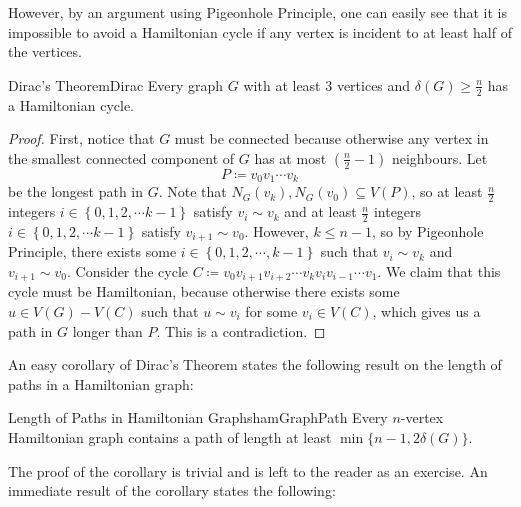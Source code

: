 \documentclass[math]{amznotes}
\theoremstyle{remark}
\newcommand{\0}{\mathbf{0}}
\newcommand{\1}{\mathbf{1}}
\begin{document}
However, by an argument using Pigeonhole Principle, one can easily see that it is impossible to avoid a Hamiltonian cycle if any vertex is incident to at least half of the vertices.
\begin{thmbox}{Dirac's Theorem}{Dirac}
    Every graph $G$ with at least $3$ vertices and $\delta(G) \geq \frac{n}{2}$ has a Hamiltonian cycle.
    \tcblower
    \begin{proof}
        First, notice that $G$ must be connected because otherwise any vertex in the smallest connected component of $G$ has at most $\left(\frac{n}{2} - 1\right)$ neighbours. Let 
        \begin{equation*}
            P \coloneqq v_0v_1\cdots v_k
        \end{equation*}
        be the longest path in $G$. Note that $N_G(v_k), N_G(v_0) \subseteq V(P)$, so at least $\frac{n}{2}$ integers $i \in \left\{0, 1, 2, \cdots k - 1\right\}$ satisfy $v_i \sim v_k$ and at least $\frac{n}{2}$ integers $i \in \left\{0, 1, 2, \cdots k - 1\right\}$ satisfy $v_{i + 1} \sim v_0$. However, $k \leq n - 1$, so by Pigeonhole Principle, there exists some $i \in \left\{0, 1, 2, \cdots, k - 1\right\}$ such that $v_i \sim v_k$ and $v_{i + 1} \sim v_0$. Consider the cycle $C \coloneqq v_0v_{i + 1}v_{i + 2}\cdots v_kv_iv_{i - 1}\cdots v_1$. We claim that this cycle must be Hamiltonian, because otherwise there exists some $u \in V(G) - V(C)$ such that $u \sim v_i$ for some $v_i \in V(C)$, which gives us a path in $G$ longer than $P$. This is a contradiction.
    \end{proof}
\end{thmbox}
An easy corollary of Dirac's Theorem states the following result on the length of paths in a Hamiltonian graph:
\begin{corbox}{Length of Paths in Hamiltonian Graphs}{hamGraphPath}
    Every $n$-vertex Hamiltonian graph contains a path of length at least $\min\{n - 1, 2\delta(G)\}$.
\end{corbox}
The proof of the corollary is trivial and is left to the reader as an exercise. An immediate result of the corollary states the following:
\end{document}
